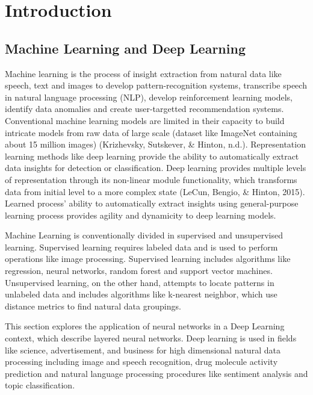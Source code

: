 \documentclass[12pt,twoside]{amherstthesis}
\begin{document}
  \section{Introduction}\label{introduction-4}
  
  \subsection{Machine Learning and Deep
  Learning}\label{machine-learning-and-deep-learning}
  
  Machine learning is the process of insight extraction from natural data
  like speech, text and images to develop pattern-recognition systems,
  transcribe speech in natural language processing (NLP), develop
  reinforcement learning models, identify data anomalies and create
  user-targetted recommendation systems. Conventional machine learning
  models are limited in their capacity to build intricate models from raw
  data of large scale (dataset like ImageNet containing about 15 million
  images) (Krizhevsky, Sutskever, \& Hinton, n.d.). Representation
  learning methods like deep learning provide the ability to automatically
  extract data insights for detection or classification. Deep learning
  provides multiple levels of representation through its non-linear module
  functionality, which transforms data from initial level to a more
  complex state (LeCun, Bengio, \& Hinton, 2015). Learned process' ability
  to automatically extract insights using general-purpose learning process
  provides agility and dynamicity to deep learning models.
  
  Machine Learning is conventionally divided in supervised and
  unsupervised learning. Supervised learning requires labeled data and is
  used to perform operations like image processing. Supervised learning
  includes algorithms like regression, neural networks, random forest and
  support vector machines. Unsupervised learning, on the other hand,
  attempts to locate patterns in unlabeled data and includes algorithms
  like k-nearest neighbor, which use distance metrics to find natural data
  groupings.
  
  This section explores the application of neural networks in a Deep
  Learning context, which describe layered neural networks. Deep learning
  is used in fields like science, advertisement, and business for high
  dimensional natural data processing including image and speech
  recognition, drug molecule activity prediction and natural language
  processing procedures like sentiment analysis and topic classification.
  
\end{document}
